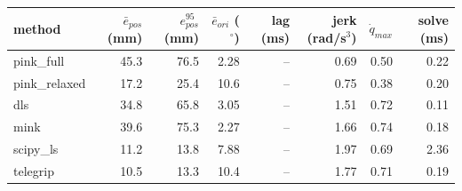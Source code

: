 \begin{tabular}{lrrrrrrr}
\toprule
method & $\bar{e}_{pos}$ (mm) & $e_{pos}^{95}$ (mm) & $\bar{e}_{ori}$ ($^\circ$) & lag (ms) & jerk (rad/s$^3$) & $\dot{q}_{max}$ & solve (ms) \\
\midrule
pink\_full & 45.3 & 76.5 & 2.28 & -- & 0.69 & 0.50 & 0.22 \\
pink\_relaxed & 17.2 & 25.4 & 10.6 & -- & 0.75 & 0.38 & 0.20 \\
dls & 34.8 & 65.8 & 3.05 & -- & 1.51 & 0.72 & 0.11 \\
mink & 39.6 & 75.3 & 2.27 & -- & 1.66 & 0.74 & 0.18 \\
scipy\_ls & 11.2 & 13.8 & 7.88 & -- & 1.97 & 0.69 & 2.36 \\
telegrip & 10.5 & 13.3 & 10.4 & -- & 1.77 & 0.71 & 0.19 \\
\bottomrule
\end{tabular}
